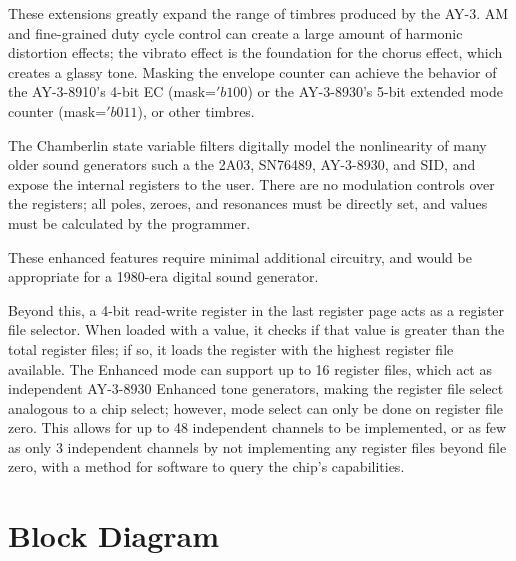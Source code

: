 
These extensions greatly expand the range of timbres produced by the AY-3.  AM and fine-grained duty cycle control can create a large amount of harmonic distortion effects; the vibrato effect is the foundation for the chorus effect, which creates a glassy tone.  Masking the envelope counter can achieve the behavior of the AY-3-8910's 4-bit EC (mask=$'b100$) or the AY-3-8930's 5-bit extended mode counter (mask=$'b011$), or other timbres.

The Chamberlin state variable filters digitally model the nonlinearity of many older sound generators such a the 2A03, SN76489, AY-3-8930, and SID, and expose the internal registers to the user.  There are no modulation controls over the registers; all poles, zeroes, and resonances must be directly set, and values must be calculated by the programmer.

These enhanced features require minimal additional circuitry, and would be appropriate for a 1980-era digital sound generator.

Beyond this, a 4-bit read-write register in the last register page acts as a register file selector.  When loaded with a value, it checks if that value is greater than the total register files; if so, it loads the register with the highest register file available.  The Enhanced mode can support up to 16 register files, which act as independent AY-3-8930 Enhanced tone generators, making the register file select analogous to a chip select; however, mode select can only be done on register file zero.  This allows for up to 48 independent channels to be implemented, or as few as only 3 independent channels by not implementing any register files beyond file zero, with a method for software to query the chip's capabilities.

\section{Block Diagram}

